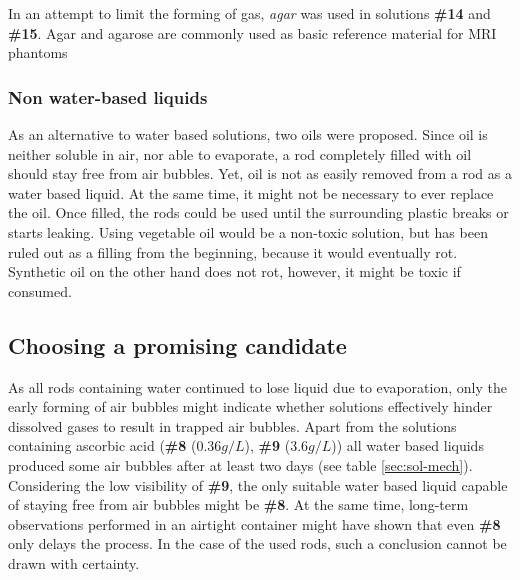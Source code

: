 In an attempt to limit the forming of gas, \textit{agar} was used in solutions \textbf{\#14} and \textbf{\#15}.
Agar and agarose are commonly used as basic reference material for MRI phantoms \cite{Bucciolini1989, Mathur-DeVre1985}

\subsubsection{Non water-based liquids}
As an alternative to water based solutions, two oils were proposed.
Since oil is neither soluble in air, nor able to evaporate, a rod completely filled with oil should stay free from air bubbles.
Yet, oil is not as easily removed from a rod as a water based liquid.
At the same time, it might not be necessary to ever replace the oil.
Once filled, the rods could be used until the surrounding plastic breaks or starts leaking.
Using vegetable oil would be a non-toxic solution, but has been ruled out as a filling from the beginning, because it would eventually rot.
Synthetic oil on the other hand does not rot, however, it might be toxic if consumed.


\subsection{Choosing a promising candidate}
As all rods containing water continued to lose liquid due to evaporation, only the early forming of air bubbles might indicate whether solutions effectively hinder dissolved gases to result in trapped air bubbles.
Apart from the solutions containing ascorbic acid (\textbf{\#8} ($0.36 g/L$), \textbf{\#9} ($3.6 g/L$)) all water based liquids produced some air bubbles after at least two days (see table \ref{sec:sol-mech}).
Considering the low visibility of \textbf{\#9}, the only suitable water based liquid capable of staying free from air bubbles might be \textbf{\#8}.
At the same time, long-term observations performed in an airtight container might have shown that even \textbf{\#8} only delays the process.
In the case of the used rods, such a conclusion cannot be drawn with certainty.

